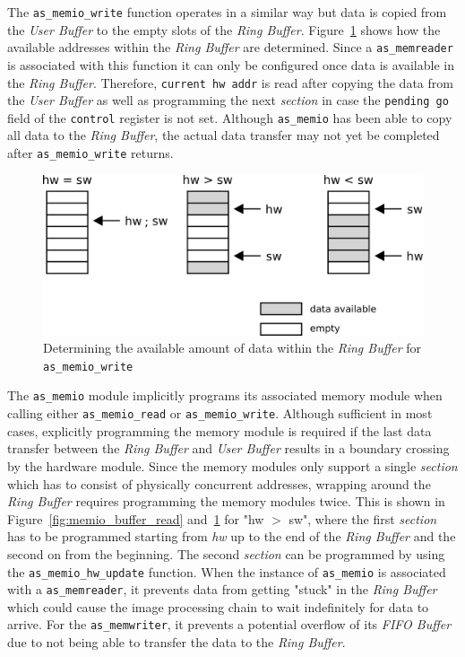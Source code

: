 The \texttt{as\_memio\_write} function operates in a similar way but data is copied from the \textit{User Buffer} to the empty slots of the \textit{Ring Buffer}.
Figure~\ref{fig:memio_buffer_write} shows how the available addresses within the \textit{Ring Buffer} are determined.
Since a \texttt{as\_memreader} is associated with this function it can only be configured once data is available in the \textit{Ring Buffer}.
Therefore, \texttt{current hw addr} is read after copying the data from the \textit{User Buffer} as well as programming the next \textit{section} in case the \texttt{pending go} field of the \texttt{control} register is not set.
Although \texttt{as\_memio} has been able to copy all data to the \textit{Ring Buffer}, the actual data transfer may not yet be completed after \texttt{as\_memio\_write} returns.

\begin{figure}[ht]
    \centering
    \includegraphics[width=0.6\linewidth,clip]{figs/memio_buffer_write.png}
    \caption{Determining the available amount of data within the \textit{Ring Buffer} for \texttt{as\_memio\_write}}
    \label{fig:memio_buffer_write}
\end{figure}

The \texttt{as\_memio} module implicitly programs its associated memory module when calling either \texttt{as\_memio\_read} or \texttt{as\_memio\_write}.
Although sufficient in most cases, explicitly programming the memory module is required if the last data transfer between the \textit{Ring Buffer} and \textit{User Buffer} results in a boundary crossing by the hardware module.
Since the memory modules only support a single \textit{section} which has to consist of physically concurrent addresses, wrapping around the \textit{Ring Buffer} requires programming the memory modules twice.
This is shown in Figure~\ref{fig:memio_buffer_read} and~\ref{fig:memio_buffer_write} for "hw $>$ sw", where the first \textit{section} has to be programmed starting from \textit{hw} up to the end of the \textit{Ring Buffer} and the second on from the beginning.
The second \textit{section} can be programmed by using the \texttt{as\_memio\_hw\_update} function.
When the instance of \texttt{as\_memio} is associated with a \texttt{as\_memreader}, it prevents data from getting "stuck" in the \textit{Ring Buffer} which could cause the image processing chain to wait indefinitely for data to arrive.
For the \texttt{as\_memwriter}, it prevents a potential overflow of its \textit{FIFO Buffer} due to not being able to transfer the data to the \textit{Ring Buffer}.

